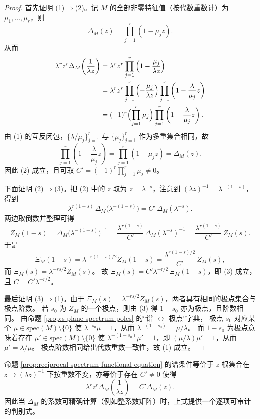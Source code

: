 \begin{proof}
首先证明 (1)\(\Rightarrow\)(2)。记 \(M\) 的全部非零特征值（按代数重数计）为 \(\mu_1,\dots,\mu_r\)，则
\[
\Delta_M(z)=\prod_{j=1}^{r}(1-\mu_j z).
\]
从而
\[
\begin{aligned}
\lambda^r z^r\Delta_M\!\left(\frac{1}{\lambda z}\right)
&=\lambda^r z^r\prod_{j=1}^r\left(1-\frac{\mu_j}{\lambda z}\right)
\\
&=\lambda^r z^r\prod_{j=1}^r\left(-\frac{\mu_j}{\lambda z}\right)\prod_{j=1}^r\left(1-\frac{\lambda}{\mu_j}z\right)
\\
&=(-1)^r\Bigl(\prod_{j=1}^r\mu_j\Bigr)\prod_{j=1}^r\left(1-\frac{\lambda}{\mu_j}z\right).
\end{aligned}
\]
由 (1) 的互反闭包，\(\{\lambda/\mu_j\}_{j=1}^r\) 与 \(\{\mu_j\}_{j=1}^r\) 作为多重集合相同，故
\[
\prod_{j=1}^r\left(1-\frac{\lambda}{\mu_j}z\right)=\prod_{j=1}^r(1-\mu_j z)=\Delta_M(z).
\]
因此 (2) 成立，且可取 \(C'=(-1)^r\prod_{j=1}^r\mu_j\neq 0\)。
\par
下面证明 (2)\(\Rightarrow\)(3)。把 (2) 中的 \(z\) 取为 \(z=\lambda^{-s}\)，注意到
\(
(\lambda z)^{-1}=\lambda^{-(1-s)}
\)，得到
\[
\lambda^{r(1-s)}\,\Delta_M\!\bigl(\lambda^{-(1-s)}\bigr)=C'\,\Delta_M(\lambda^{-s}).
\]
两边取倒数并整理可得
\[
Z_M(1-s)=\Delta_M\!\bigl(\lambda^{-(1-s)}\bigr)^{-1}=\frac{\lambda^{r(1-s)}}{C'}\,\Delta_M(\lambda^{-s})^{-1}=\frac{\lambda^{r(1-s)}}{C'}\,Z_M(s).
\]
于是
\[
\Xi_M(1-s)
=\lambda^{-r(1-s)/2}Z_M(1-s)
=\frac{\lambda^{r(1-s)/2}}{C'}\,Z_M(s),
\]
而
\(
\Xi_M(s)=\lambda^{-rs/2}Z_M(s)
\)。
故
\(
\Xi_M(s)=C'\lambda^{-r/2}\,\Xi_M(1-s)
\)，即 (3) 成立，且 \(C=C'\lambda^{-r/2}\)。
\par
最后证明 (3)\(\Rightarrow\)(1)。由于 \(\Xi_M(s)=\lambda^{-rs/2}Z_M(s)\)，两者具有相同的极点集合与极点阶数。
若 \(s_0\) 为 \(Z_M\) 的一个极点，则由 (3) 得 \(1-s_0\) 亦为极点，且阶数相同。
由命题 \ref{prop:s-plane-spectrum-poles} 的“谱 \(\leftrightarrow\) 极点”字典，
极点 \(s_0\) 对应某个 \(\mu\in\mathrm{spec}(M)\setminus\{0\}\) 使 \(\lambda^{-s_0}\mu=1\)，从而 \(\lambda^{-(1-s_0)}=\mu/\lambda\)。
而 \(1-s_0\) 为极点意味着存在 \(\mu'\in\mathrm{spec}(M)\setminus\{0\}\) 使 \(\lambda^{-(1-s_0)}\mu'=1\)，即 \((\mu/\lambda)\mu'=1\)，从而 \(\mu'=\lambda/\mu\)。
极点阶数相同给出代数重数一致性，故 (1) 成立。
\end{proof}

\begin{remark}\label{rem:delta-reciprocal-polynomial}
命题 \ref{prop:reciprocal-spectrum-functional-equation} 的谱条件等价于 $z$-根集合在
\(
z\mapsto (\lambda z)^{-1}
\)
下按重数不变，亦等价于存在 $C'\neq 0$ 使得
\[
\lambda^{r}z^{r}\Delta_M\!\left(\frac{1}{\lambda z}\right)=C'\Delta_M(z).
\]
因此当 $\Delta_M$ 的系数可精确计算（例如整系数矩阵）时，上式提供一个逐项可审计的判别式。
\end{remark}


